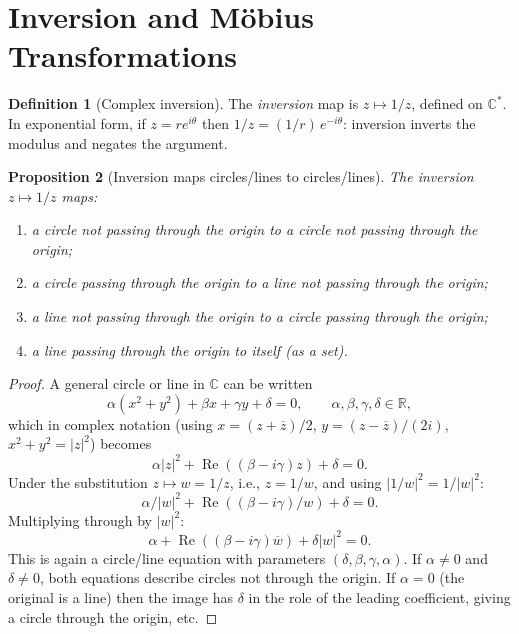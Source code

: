 \documentclass[12pt,a4paper,openany]{book}
\theoremstyle{definition}
\newtheorem{definition}{Definition}[chapter]
\theoremstyle{plain}
\newtheorem{proposition}[definition]{Proposition}
\theoremstyle{remark}
\newcommand{\C}{\mathbb{C}}
\newcommand{\R}{\mathbb{R}}
\DeclareMathOperator{\re}{Re}
\newcommand{\abs}[1]{\left|#1\right|}
\newcommand{\conj}[1]{\overline{#1}}
\begin{document}
\section{Inversion and M\"obius Transformations}
\label{sec:mobius}

\begin{definition}[Complex inversion]
\label{def:inversion}
The \emph{inversion} map is $z\mapsto 1/z$, defined on $\C^*$. In exponential form, if $z=re^{i\theta}$ then $1/z = (1/r)\,e^{-i\theta}$: inversion inverts the modulus and negates the argument.
\end{definition}

\begin{proposition}[Inversion maps circles/lines to circles/lines]
\label{prop:inversion-circles}
The inversion $z\mapsto 1/z$ maps:
\begin{enumerate}[label=\textup{(\roman*)}]
  \item a circle not passing through the origin to a circle not passing through the origin;
  \item a circle passing through the origin to a line not passing through the origin;
  \item a line not passing through the origin to a circle passing through the origin;
  \item a line passing through the origin to itself \textup{(as a set)}.
\end{enumerate}
\end{proposition}

\begin{proof}
A general circle or line in $\C$ can be written
\[
  \alpha(x^2+y^2) + \beta x + \gamma y + \delta = 0, \qquad \alpha,\beta,\gamma,\delta\in\R,
\]
which in complex notation (using $x=(z+\conj{z})/2$, $y=(z-\conj{z})/(2i)$, $x^2+y^2=\abs{z}^2$) becomes
\[
  \alpha\abs{z}^2 + \re((\beta-i\gamma)z) + \delta = 0.
\]
Under the substitution $z\mapsto w=1/z$, i.e., $z=1/w$, and using $\abs{1/w}^2 = 1/\abs{w}^2$:
\[
  \alpha/\abs{w}^2 + \re((\beta-i\gamma)/w) + \delta = 0.
\]
Multiplying through by $\abs{w}^2$:
\[
  \alpha + \re((\beta-i\gamma)\conj{w}) + \delta\abs{w}^2 = 0.
\]
This is again a circle/line equation with parameters $(\delta,\beta,\gamma,\alpha)$. If $\alpha\neq 0$ and $\delta\neq 0$, both equations describe circles not through the origin. If $\alpha=0$ (the original is a line) then the image has $\delta$ in the role of the leading coefficient, giving a circle through the origin, etc.
\end{proof}
\end{document}
